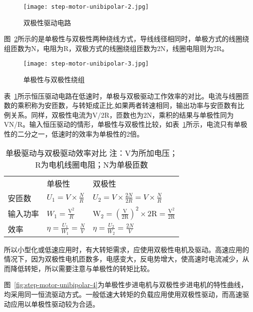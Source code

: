 \begin{figure}[htbp]
    \centering
    \texttt{[image: step-motor-unibipolar-2.jpg]}
    \caption{双极性驱动电路}
    \label{fig:step-motor-unibipolar-2}
\end{figure}

图~\ref{fig:step-motor-unibipolar-3}所示的是单极性与双极性两种绕线方式，导线线径相同时，单极方式的线圈绕组匝数为N，电阻为R，双极方式的线圈绕组匝数为2N，线圈电阻则为2R。

\begin{figure}[htbp]
    \centering
    \texttt{[image: step-motor-unibipolar-3.jpg]}
    \caption{单极性与双极性绕组}
    \label{fig:step-motor-unibipolar-3}
\end{figure}

表~\ref{tab:step-motor-unibipolar}所示恒压驱动电路在低速时，单极与双极驱动工作效率的对比。电流与线圈匝数的乘积称为安匝数，与转矩成正比,如果两者转速相同，输出功率与安匝数有比例关系。同样，双极性电流为V/2R，匝数也为2N，乘积的结果与单极性同为VN/R。输入恒压驱动的情形，单极性与双极性比较，如表~\ref{tab:step-motor-unibipolar}所示，电流只有单极性的二分之一，低速时的效率为单极性的2倍。

\begin{table}[htbp]
    \centering
    \begin{tabular}{lll}
     & 单极性 & 双极性 \\
    安匝数 & $U_{1}=V \times \frac{N}{R}$ & $U_{2}=V \times \frac{2N}{2R}=V \times \frac{N}{R}$\\
    输入功率 & $W_{1}=\frac{\mathrm{V}^{2}}{R}$ & $\mathrm{W}_{2}=(\frac{\mathrm{V}}{2 \mathrm{R}} )^{2} \times  2 \mathrm{R}=\frac{\mathrm{V}^{2}}{2 \mathrm{R}} $ \\
    效率 & $\eta = \frac{U_{1}}{W_{1}} = \frac{N}{V}$ & $\eta = \frac{U_{2}}{W_{2}} = \frac{2N}{V}$
    \end{tabular}
    \caption{单极驱动与双极驱动效率对比 注：V为所加电压；R为电机线圈电阻；N为单极匝数}
    \label{tab:step-motor-unibipolar}
\end{table}

所以小型化或低速应用时，有大转矩需求，应使用双极性电机及驱动。高速应用的情况下，因为双极性电机匝数多，电感变大，反电势增大，使高速时电流减少，从而降低转矩，所以需要注意与单极性的转矩比较。

图~\ref{fig:step-motor-unibipolar-4}为单极性步进电机与双极性步进电机的特性曲线，均采用同一恒流驱动方式。一般低速大转矩的负载应用使用双极性驱动，而高速驱动应用以单极性驱动较为合适。

